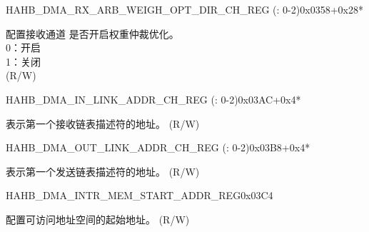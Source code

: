 \begin{register}{H}{AHB\_DMA\_RX\_ARB\_WEIGH\_OPT\_DIR\_CH\_REG (: 0-2)}{0x0358+0x28*}\label{regdesc:AHBDMARXARBWEIGHOPTDIRCHNREG}
%
%
\regnewline%
\begin{regdesc}\begin{reglist}
\label{fielddesc:AHBDMARXARBWEIGHOPTDIRCHN}\item [AHB\_DMA\_RX\_ARB\_WEIGH\_OPT\_DIR\_CH\regindex{n}] 配置接收通道  是否开启权重仲裁优化。\\
0：开启\\
1：关闭\\ (R/W)
\end{reglist}\end{regdesc}
\end{register}


\begin{register}{H}{AHB\_DMA\_IN\_LINK\_ADDR\_CH\_REG (: 0-2)}{0x03AC+0x4*}\label{regdesc:AHBDMAINLINKADDRCHNREG}
%
\regnewline%
\begin{regdesc}\begin{reglist}
\label{fielddesc:AHBDMAINLINKADDRCHN}\item [AHB\_DMA\_INLINK\_ADDR\_CH\regindex{n}] 表示第一个接收链表描述符的地址。 (R/W)
\end{reglist}\end{regdesc}
\end{register}


\begin{register}{H}{AHB\_DMA\_OUT\_LINK\_ADDR\_CH\_REG (: 0-2)}{0x03B8+0x4*}\label{regdesc:AHBDMAOUTLINKADDRCHNREG}
%
\regnewline%
\begin{regdesc}\begin{reglist}
\label{fielddesc:AHBDMAOUTLINKADDRCHN}\item [AHB\_DMA\_OUTLINK\_ADDR\_CH\regindex{n}] 表示第一个发送链表描述符的地址。 (R/W)
\end{reglist}\end{regdesc}
\end{register}


\begin{register}{H}{AHB\_DMA\_INTR\_MEM\_START\_ADDR\_REG}{0x03C4}\label{regdesc:AHBDMAINTRMEMSTARTADDRREG}
%
\regnewline%
\begin{regdesc}\begin{reglist}
\label{fielddesc:AHBDMAACCESSINTRMEMSTARTADDR}\item [AHB\_DMA\_ACCESS\_INTR\_MEM\_START\_ADDR] 配置可访问地址空间的起始地址。 (R/W)
\end{reglist}\end{regdesc}
\end{register}



